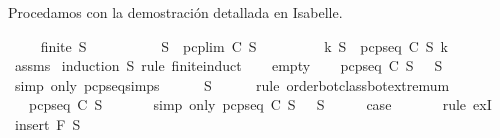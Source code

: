 \begin{isabellebody}
\begin{isamarkuptext}
  Procedamos con la demostración detallada en Isabelle.%
\end{isamarkuptext}\isamarkuptrue%
\isamarkupfalse%
\ \isanewline
\ \ \ {\isachardoublequoteopen}finite\ S{\isacharprime}{\isachardoublequoteclose}\isanewline
\ \ \ \ \ \ \ \ \ \ {\isachardoublequoteopen}S{\isacharprime}\ {\isasymsubseteq}\ pcp{\isacharunderscore}lim\ C\ S{\isachardoublequoteclose}\isanewline
\ \ \ \ \ \ \ \ \ {\isachardoublequoteopen}{\isasymexists}k{\isachardot}\ S{\isacharprime}\ {\isasymsubseteq}\ pcp{\isacharunderscore}seq\ C\ S\ k{\isachardoublequoteclose}\isanewline
%
\isadelimproof
\ \ %
\endisadelimproof
%
\isatagproof
{}\isamarkupfalse%
\ assms\isanewline
{}\isamarkupfalse%
\ {\isacharparenleft}induction\ S{\isacharprime}\ rule{\isacharcolon}\ finite{\isacharunderscore}induct{\isacharparenright}\isanewline
\ \ \isamarkupfalse%
\ empty\isanewline
\ \ \isamarkupfalse%
\ {\isachardoublequoteopen}pcp{\isacharunderscore}seq\ C\ S\ {}\ {\isacharequal}\ S{\isachardoublequoteclose}\isanewline
\ \ \ \ \isamarkupfalse%
\ {\isacharparenleft}simp\ only{\isacharcolon}\ pcp{\isacharunderscore}seq{\isachardot}simps{\isacharparenleft}{}{\isacharparenright}{\isacharparenright}\isanewline
\ \ \isamarkupfalse%
\ {\isachardoublequoteopen}{\isacharbraceleft}{\isacharbraceright}\ {\isasymsubseteq}\ S{\isachardoublequoteclose}\isanewline
\ \ \ \ \isamarkupfalse%
\ {\isacharparenleft}rule\ order{\isacharunderscore}bot{\isacharunderscore}class{\isachardot}bot{\isachardot}extremum{\isacharparenright}\isanewline
\ \ \isamarkupfalse%
\ \isamarkupfalse%
\ {\isachardoublequoteopen}{\isacharbraceleft}{\isacharbraceright}\ {\isasymsubseteq}\ pcp{\isacharunderscore}seq\ C\ S\ {}{\isachardoublequoteclose}\isanewline
\ \ \ \ \isamarkupfalse%
\ {\isacharparenleft}simp\ only{\isacharcolon}\ {\isacartoucheopen}pcp{\isacharunderscore}seq\ C\ S\ {}\ {\isacharequal}\ S{\isacartoucheclose}{\isacharparenright}\isanewline
\ \ \isamarkupfalse%
\ \isamarkupfalse%
\ {\isacharquery}case\ \isanewline
\ \ \ \ \isamarkupfalse%
\ {\isacharparenleft}rule\ exI{\isacharparenright}\isanewline
{}\isamarkupfalse%
\isanewline
\ \ \isamarkupfalse%
\ {\isacharparenleft}insert\ F\ S{\isacharprime}{\isacharparenright}\isanewline
\ \ \isamarkupfalse%

\end{isabellebody}
